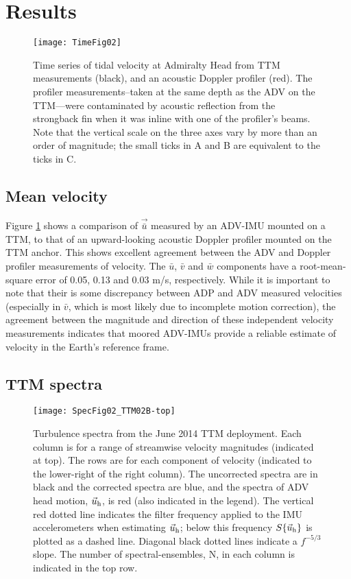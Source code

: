 \section{Results}
\label{sec:results}

\begin{figure}[t]
  \centering
  \texttt{[image: TimeFig02]}
  \caption{Time series of tidal velocity at Admiralty Head from TTM measurements (black), and an acoustic Doppler profiler (red). The profiler measurements--taken at the same depth as the ADV on the TTM---were contaminated by acoustic reflection from the strongback fin when it was inline with one of the profiler's beams. Note that the vertical scale on the three axes vary by more than an order of magnitude; the small ticks in A and B are equivalent to the ticks in C.}
  \label{fig:vel_time}
\end{figure}

\subsection{Mean velocity}

Figure \ref{fig:vel_time} shows a comparison of $\vec{\bar u}$ measured by an ADV-IMU mounted on a TTM, to that of an upward-looking acoustic Doppler profiler mounted on the TTM anchor. This shows excellent agreement between the ADV and Doppler profiler measurements of velocity. The $\bar u$, $\bar v$ and $\bar w$ components have a root-mean-square error of 0.05, 0.13 and 0.03 m/s, respectively.
While it is important to note that their is some discrepancy between ADP and ADV measured velocities (especially in $\bar v$, which is most likely due to incomplete motion correction), the agreement between the magnitude and direction of these independent velocity measurements indicates that moored ADV-IMUs provide a reliable estimate of velocity in the Earth's reference frame.

\subsection{TTM spectra}

\begin{figure*}[t]
  \centering
  \texttt{[image: SpecFig02\_TTM02B-top]}
  \caption{Turbulence spectra from the June 2014 TTM deployment. Each column is for a range of streamwise velocity magnitudes (indicated at top). The rows are for each component of velocity (indicated to the lower-right of the right column). The uncorrected spectra are in black and the corrected spectra are blue, and the spectra of ADV head motion, $\vec{u}_\mathrm{h}$, is red (also indicated in the legend). The vertical red dotted line indicates the filter frequency applied to the IMU accelerometers when estimating $\vec{u}_\mathrm{h}$; below this frequency $S\{\vec{u}_\mathrm{h}\}$ is plotted as a dashed line.   Diagonal black dotted lines indicate a $f^{-5/3}$ slope. The number of spectral-ensembles, N, in each column is indicated in the top row.}
  \label{fig:spec:ttm}
\end{figure*}

